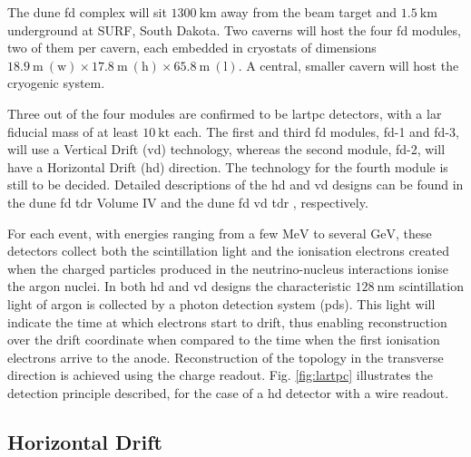 The \gls{dune} \gls{fd} complex will sit $1300~\mathrm{km}$ away from the beam target and $1.5~\mathrm{km}$ underground at SURF, South Dakota. Two caverns will host the four \gls{fd} modules, two of them per cavern, each embedded in cryostats of dimensions $18.9~\mathrm{m} ~ (\text{w}) \times 17.8~\mathrm{m} ~ (\text{h}) \times 65.8~\mathrm{m} ~ (\text{l})$. A central, smaller cavern will host the cryogenic system.

Three out of the four modules are confirmed to be \gls{lartpc} detectors, with a \gls{lar} fiducial mass of at least $10 ~ \mathrm{kt}$ each. The first and third \gls{fd} modules, \gls{fd}-1 and \gls{fd}-3, will use a Vertical Drift (\gls{vd}) technology, whereas the second module, \gls{fd}-2, will have a Horizontal Drift (\gls{hd}) direction. The technology for the fourth module is still to be decided. Detailed descriptions of the \gls{hd} and \gls{vd} designs can be found in the \gls{dune} \gls{fd} \gls{tdr} Volume IV \cite{DUNE2020TDR4} and the \gls{dune} \gls{fd} \gls{vd} \gls{tdr} \cite{DUNEVDTDR}, respectively.

For each event, with energies ranging from a few $\mathrm{MeV}$ to several $\mathrm{GeV}$, these detectors collect both the scintillation light and the ionisation electrons created when the charged particles produced in the neutrino-nucleus interactions ionise the argon nuclei. In both \gls{hd} and \gls{vd} designs the characteristic $128~\mathrm{nm}$ scintillation light of argon is collected by a photon detection system (\gls{pds}). This light will indicate the time at which electrons start to drift, thus enabling reconstruction over the drift coordinate when compared to the time when the first ionisation electrons arrive to the anode. Reconstruction of the topology in the transverse direction is achieved using the charge readout. Fig. \ref{fig:lartpc} illustrates the detection principle described, for the case of a \gls{hd} detector with a wire readout.

\subsection{Horizontal Drift}

